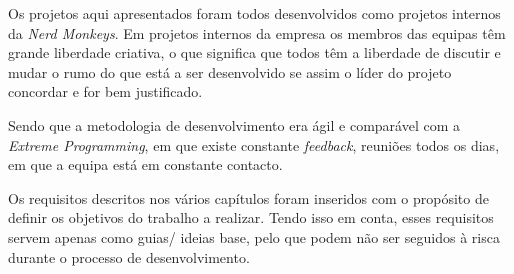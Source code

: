Os projetos aqui apresentados foram todos desenvolvidos como projetos internos da \textit{Nerd Monkeys}. Em projetos internos da empresa os membros das equipas têm grande liberdade criativa, o que significa que todos têm a liberdade de discutir e mudar o rumo do que está a ser desenvolvido se assim o líder do projeto concordar e for bem justificado.

Sendo que a metodologia de desenvolvimento era ágil e comparável com a \textit{Extreme Programming}, em que existe constante \textit{feedback}, reuniões todos os dias, em que a equipa está em constante contacto.

Os requisitos descritos nos vários capítulos foram inseridos com o propósito de definir os objetivos do trabalho a realizar. Tendo isso em conta, esses requisitos servem apenas como guias/
ideias base, pelo que podem não ser seguidos à risca durante o processo de desenvolvimento.


